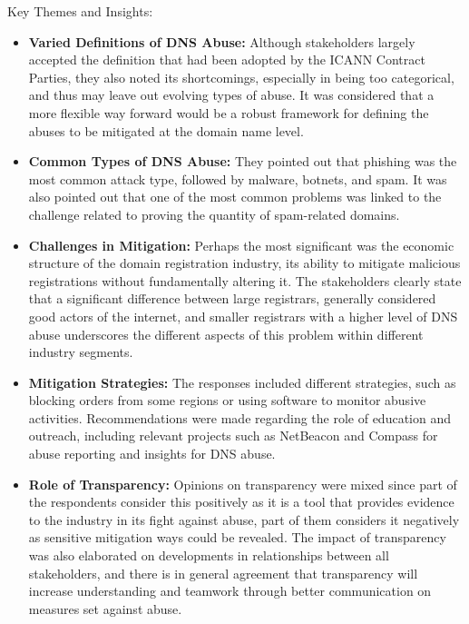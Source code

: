 Key Themes and Insights:

\begin{itemize}
  \item \textbf{Varied Definitions of DNS Abuse:} Although stakeholders largely accepted the definition that had been adopted by the ICANN Contract Parties, they also noted its shortcomings, especially in being too categorical, and thus may leave out evolving types of abuse. It was considered that a more flexible way forward would be a robust framework for defining the abuses to be mitigated at the domain name level.
  
  \item \textbf{Common Types of DNS Abuse:} They pointed out that phishing was the most common attack type, followed by malware, botnets, and spam. It was also pointed out that one of the most common problems was linked to the challenge related to proving the quantity of spam-related domains.
  
  \item \textbf{Challenges in Mitigation:} Perhaps the most significant was the economic structure of the domain registration industry, its ability to mitigate malicious registrations without fundamentally altering it. The stakeholders clearly state that a significant difference between large registrars, generally considered good actors of the internet, and smaller registrars with a higher level of DNS abuse underscores the different aspects of this problem within different industry segments.
  
  \item \textbf{Mitigation Strategies:} The responses included different strategies, such as blocking orders from some regions or using software to monitor abusive activities. Recommendations were made regarding the role of education and outreach, including relevant projects such as NetBeacon and Compass for abuse reporting and insights for DNS abuse.
  \item \textbf{Role of Transparency:} Opinions on transparency were mixed since part of the respondents consider this positively as it is a tool that provides evidence to the industry in its fight against abuse, part of them considers it negatively as sensitive mitigation ways could be revealed. The impact of transparency was also elaborated on developments in relationships between all stakeholders, and there is in general agreement that transparency will increase understanding and teamwork through better communication on measures set against abuse.
  
\end{itemize}

